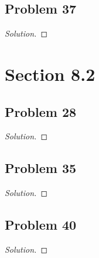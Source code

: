 \documentclass{article}
\newenvironment{solution}{\renewcommand\qedsymbol{}\begin{proof}[Solution]}{\end{proof}}
\begin{document}
\subsection*{Problem 37}
\begin{solution}
\end{solution}
\clearpage

\section*{Section 8.2}
\subsection*{Problem 28}
\begin{solution}
\end{solution}
\clearpage

\subsection*{Problem 35}
\begin{solution}
\end{solution}
\clearpage

\subsection*{Problem 40}
\begin{solution}
\end{solution}
\clearpage
\end{document}
